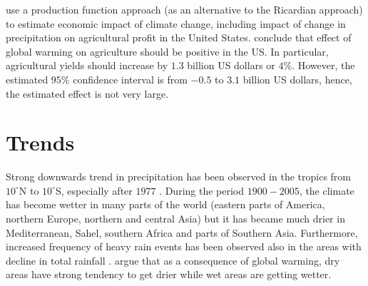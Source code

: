 \documentclass[a4paper,12pt]{article}
\begin{document}
\cite{Deschenes2007Ric} use a production function approach (as an alternative to the Ricardian approach) to estimate economic impact of climate change, including impact of change in precipitation on agricultural profit in the United States. \cite{Deschenes2007Ric} conclude that effect of global warming on agriculture should be positive in the US. In particular, agricultural yields should increase by $1.3$ billion US dollars or $4\%$. However, the estimated $95\%$ confidence interval is from $-0.5$ to $3.1$ billion US dollars, hence, the estimated effect is not very large.


\section*{Trends}

 Strong downwards trend in precipitation has been observed in the tropics from $10^\circ$N to $10^\circ$S, especially after $1977$ \citep{IPCCtrenberth}. During the period $1900-2005$, the climate has become wetter in many parts of the world (eastern parts of America, northern Europe, northern and central Asia) but it has became much drier in Mediterranean, Sahel, southern Africa and parts of Southern Asia. Furthermore, increased frequency of heavy rain events has been observed also in the areas with decline in total rainfall \citep{IPCCtrenberth}. \cite{Trenberth2014} argue that as a consequence of global warming, dry areas have strong tendency to get drier while wet areas are getting wetter. 
 \pagebreak


\end{document}
